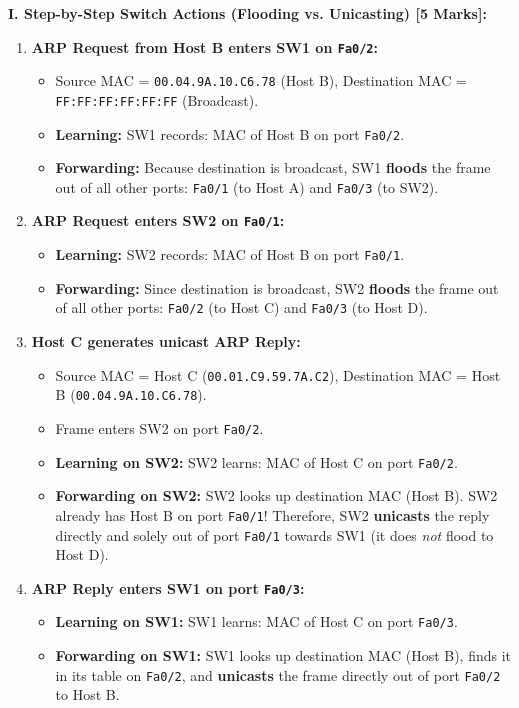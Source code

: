\documentclass[11pt,a4paper]{article}
\begin{document}
\textbf{I. Step-by-Step Switch Actions (Flooding vs. Unicasting) [5 Marks]:}
\begin{enumerate}
    \item \textbf{ARP Request from Host B enters SW1 on \texttt{Fa0/2}:}
    \begin{itemize}
        \item Source MAC = \texttt{00.04.9A.10.C6.78} (Host B), Destination MAC = \texttt{FF:FF:FF:FF:FF:FF} (Broadcast).
        \item \textbf{Learning:} SW1 records: MAC of Host B on port \texttt{Fa0/2}.
        \item \textbf{Forwarding:} Because destination is broadcast, SW1 \textbf{floods} the frame out of all other ports: \texttt{Fa0/1} (to Host A) and \texttt{Fa0/3} (to SW2).
    \end{itemize}

    \item \textbf{ARP Request enters SW2 on \texttt{Fa0/1}:}
    \begin{itemize}
        \item \textbf{Learning:} SW2 records: MAC of Host B on port \texttt{Fa0/1}.
        \item \textbf{Forwarding:} Since destination is broadcast, SW2 \textbf{floods} the frame out of all other ports: \texttt{Fa0/2} (to Host C) and \texttt{Fa0/3} (to Host D).
    \end{itemize}

    \item \textbf{Host C generates unicast ARP Reply:}
    \begin{itemize}
        \item Source MAC = Host C (\texttt{00.01.C9.59.7A.C2}), Destination MAC = Host B (\texttt{00.04.9A.10.C6.78}).
        \item Frame enters SW2 on port \texttt{Fa0/2}.
        \item \textbf{Learning on SW2:} SW2 learns: MAC of Host C on port \texttt{Fa0/2}.
        \item \textbf{Forwarding on SW2:} SW2 looks up destination MAC (Host B). SW2 already has Host B on port \texttt{Fa0/1}! Therefore, SW2 \textbf{unicasts} the reply directly and solely out of port \texttt{Fa0/1} towards SW1 (it does \emph{not} flood to Host D).
    \end{itemize}

    \item \textbf{ARP Reply enters SW1 on port \texttt{Fa0/3}:}
    \begin{itemize}
        \item \textbf{Learning on SW1:} SW1 learns: MAC of Host C on port \texttt{Fa0/3}.
        \item \textbf{Forwarding on SW1:} SW1 looks up destination MAC (Host B), finds it in its table on \texttt{Fa0/2}, and \textbf{unicasts} the frame directly out of port \texttt{Fa0/2} to Host B.
    \end{itemize}
\end{enumerate}
\end{document}
